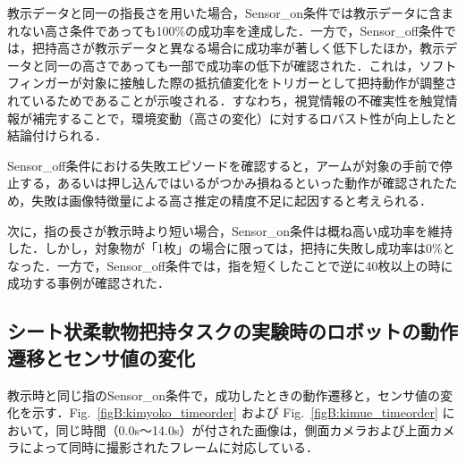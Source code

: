 教示データと同一の指長さを用いた場合，Sensor\_on条件では教示データに含まれない高さ条件であっても100\%の成功率を達成した．一方で，Sensor\_off条件では，把持高さが教示データと異なる場合に成功率が著しく低下したほか，教示データと同一の高さであっても一部で成功率の低下が確認された．これは，ソフトフィンガーが対象に接触した際の抵抗値変化をトリガーとして把持動作が調整されているためであることが示唆される．すなわち，視覚情報の不確実性を触覚情報が補完することで，環境変動（高さの変化）に対するロバスト性が向上したと結論付けられる．\par

Sensor\_off条件における失敗エピソードを確認すると，アームが対象の手前で停止する，あるいは押し込んではいるがつかみ損ねるといった動作が確認されたため，失敗は画像特徴量による高さ推定の精度不足に起因すると考えられる．\par

次に，指の長さが教示時より短い場合，Sensor\_on条件は概ね高い成功率を維持した．しかし，対象物が「1枚」の場合に限っては，把持に失敗し成功率は0\%となった．一方で，Sensor\_off条件では，指を短くしたことで逆に40枚以上の時に成功する事例が確認された．\par


\clearpage
\subsection*{シート状柔軟物把持タスクの実験時のロボットの動作遷移とセンサ値の変化}

教示時と同じ指のSensor\_on条件で，成功したときの動作遷移と，センサ値の変化を示す．Fig.~\ref{figB:kimyoko_timeorder} および Fig.~\ref{figB:kimue_timeorder} において，同じ時間（0.0s～14.0s）が付された画像は，側面カメラおよび上面カメラによって同時に撮影されたフレームに対応している．

